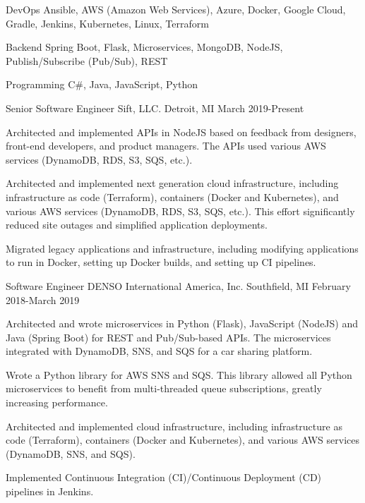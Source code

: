\documentclass[11pt, a4paper]{awesome-cv}
\begin{document}
\makecvheader[C]


\begin{cvskills}
    \cvskill
    {DevOps}
    {Ansible, AWS (Amazon Web Services), Azure, Docker, Google Cloud, Gradle, Jenkins, Kubernetes, Linux, Terraform}

    \cvskill
    {Backend}
    {Spring Boot, Flask, Microservices, MongoDB, NodeJS, Publish/Subscribe (Pub/Sub), REST}

    \cvskill
    {Programming}
    {C\#, Java, JavaScript, Python}
\end{cvskills}

\begin{cventries}
    \cventry
    {Senior Software Engineer}
    {Sift, LLC.}
    {Detroit, MI}
    {March 2019-Present}
    {
        \begin{cvitems}
            \item{Architected and implemented APIs in NodeJS based on feedback from designers, front-end developers, and product managers. The APIs used various AWS services (DynamoDB, RDS, S3, SQS, etc.).}
            \item{Architected and implemented next generation cloud infrastructure, including infrastructure as code (Terraform), containers (Docker and Kubernetes), and various AWS services (DynamoDB, RDS, S3, SQS, etc.). This effort significantly reduced site outages and simplified application deployments.}
            \item{Migrated legacy applications and infrastructure, including modifying applications to run in Docker, setting up Docker builds, and setting up CI pipelines.}
        \end{cvitems}
    }

    \cventry
    {Software Engineer}
    {DENSO International America, Inc.}
    {Southfield, MI}
    {February 2018-March 2019}
    {
        \begin{cvitems}
            \item{Architected and wrote microservices in Python (Flask), JavaScript (NodeJS) and Java (Spring Boot) for REST and Pub/Sub-based APIs. The microservices integrated with DynamoDB, SNS, and SQS for a car sharing platform.}
            \item{Wrote a Python library for AWS SNS and SQS. This library allowed all Python microservices to benefit from multi-threaded queue subscriptions, greatly increasing performance.}
            \item{Architected and implemented cloud infrastructure, including infrastructure as code (Terraform), containers (Docker and Kubernetes), and various AWS services (DynamoDB, SNS, and SQS).}
            \item{Implemented Continuous Integration (CI)/Continuous Deployment (CD) pipelines in Jenkins.}
        \end{cvitems}
    }


\end{cventries}
\end{document}
